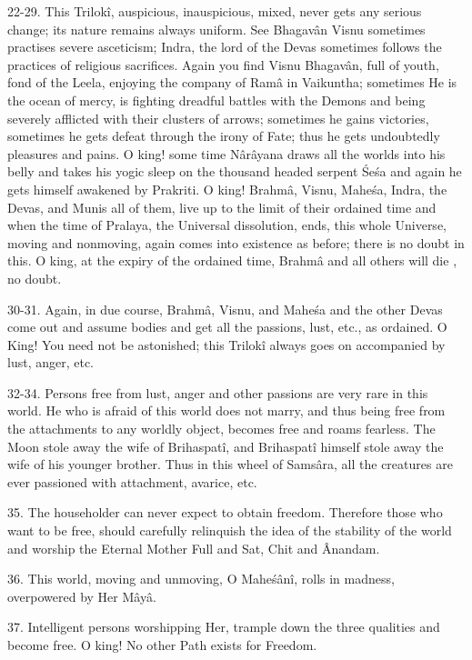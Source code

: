 22-29. This Trilok\^i, auspicious, inauspicious, mixed, never gets any serious change; its nature remains always uniform. See Bhagav\^an Visnu sometimes practises severe asceticism; Indra, the lord of the Devas sometimes follows the practices of religious sacrifices. Again you find Visnu Bhagav\^an, full of youth, fond of the Leela, enjoying the company of Ram\^a in Vaikuntha; sometimes He is the ocean of mercy, is fighting dreadful battles with the Demons and being severely afflicted with their clusters of arrows; sometimes he gains victories, sometimes he gets defeat through the irony of Fate; thus he gets undoubtedly pleasures and pains. O king! some time N\^ar\^ayana draws all the worlds into his belly and takes his yogic sleep on the thousand headed serpent \'Se\'sa and again he gets himself awakened by Prakriti. O king! Brahm\^a, Visnu, Mahe\'sa, Indra, the Devas, and Munis all of them, live up to the limit of their ordained time and when the time of Pralaya, the Universal dissolution, ends, this whole Universe, moving and nonmoving, again comes into existence as before; there is no doubt in this. O king, at the expiry of the ordained time, Brahm\^a and all others will die , no doubt.

30-31. Again, in due course, Brahm\^a, Visnu, and Mahe\'sa and the other Devas come out and assume bodies and get all the passions, lust, etc., as ordained. O King! You need not be astonished; this Trilok\^i always goes on accompanied by lust, anger, etc.

32-34. Persons free from lust, anger and other passions are very rare in this world. He who is afraid of this world does not marry, and thus being free from the attachments to any worldly object, becomes free and roams fearless. The Moon stole away the wife of Brihaspat\^i, and Brihaspat\^i himself stole away the wife of his younger brother. Thus in this wheel of Sams\^ara, all the creatures are ever passioned with attachment, avarice, etc.

35. The householder can never expect to obtain freedom. Therefore those who want to be free, should carefully relinquish the idea of the stability of the world and worship the Eternal Mother Full and Sat, Chit and \^Anandam.

36. This world, moving and unmoving, O Mahe\'s\^an\^i, rolls in madness, overpowered by Her M\^ay\^a.

37. Intelligent persons worshipping Her, trample down the three qualities and become free. O king! No other Path exists for Freedom.

